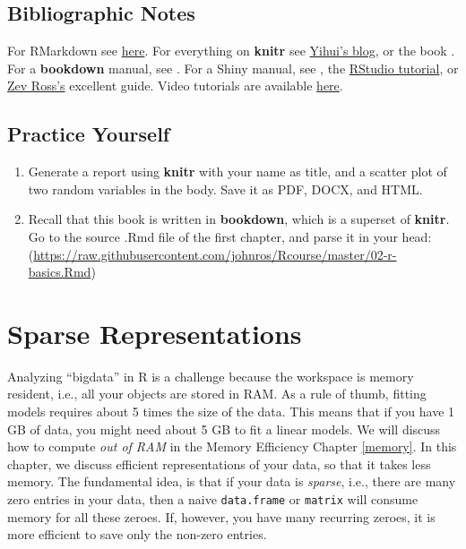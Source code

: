 \documentclass[]{book}
\theoremstyle{definition}
\theoremstyle{definition}
\theoremstyle{definition}
\theoremstyle{remark}
\begin{document}
\section{Bibliographic Notes}\label{bibliographic-notes-10}

For RMarkdown see \href{http://rmarkdown.rstudio.com/}{here}. For
everything on \textbf{knitr} see
\href{https://yihui.name/knitr/}{Yihui's blog}, or the book
\citet{xie2015dynamic}. For a \textbf{bookdown} manual, see
\citet{xie2016bookdown}. For a Shiny manual, see \citet{shiny}, the
\href{http://shiny.rstudio.com/tutorial/}{RStudio tutorial}, or
\href{http://zevross.com/blog/2016/04/19/r-powered-web-applications-with-shiny-a-tutorial-and-cheat-sheet-with-40-example-apps/}{Zev
Ross's} excellent guide. Video tutorials are available
\href{https://www.rstudio.com/resources/webinars/shiny-developer-conference/}{here}.

\section{Practice Yourself}\label{practice-yourself-9}

\begin{enumerate}
\def\labelenumi{\arabic{enumi}.}
\item
  Generate a report using \textbf{knitr} with your name as title, and a
  scatter plot of two random variables in the body. Save it as PDF,
  DOCX, and HTML.
\item
  Recall that this book is written in \textbf{bookdown}, which is a
  superset of \textbf{knitr}. Go to the source .Rmd file of the first
  chapter, and parse it in your head:
  (\url{https://raw.githubusercontent.com/johnros/Rcourse/master/02-r-basics.Rmd})
\end{enumerate}

\chapter{Sparse Representations}\label{sparse}

Analyzing ``bigdata'' in R is a challenge because the workspace is
memory resident, i.e., all your objects are stored in RAM. As a rule of
thumb, fitting models requires about 5 times the size of the data. This
means that if you have 1 GB of data, you might need about 5 GB to fit a
linear models. We will discuss how to compute \emph{out of RAM} in the
Memory Efficiency Chapter \ref{memory}. In this chapter, we discuss
efficient representations of your data, so that it takes less memory.
The fundamental idea, is that if your data is \emph{sparse}, i.e., there
are many zero entries in your data, then a naive \texttt{data.frame} or
\texttt{matrix} will consume memory for all these zeroes. If, however,
you have many recurring zeroes, it is more efficient to save only the
non-zero entries.
\end{document}
